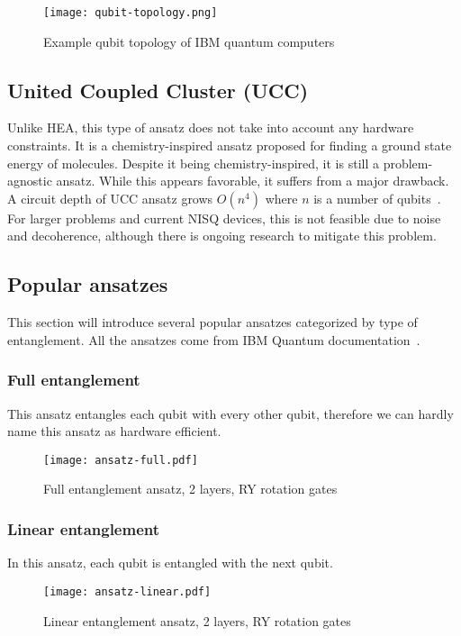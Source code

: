 \begin{figure}[H]
    \texttt{[image: qubit-topology.png]}
    \caption{Example qubit topology of IBM quantum computers~\cite{img:topology}}
    \label{fig:qubit_topology}
\end{figure}

\subsection{United Coupled Cluster (UCC)}
Unlike HEA, this type of ansatz does not take into account any hardware constraints. It is a chemistry-inspired ansatz proposed for finding a ground state energy of molecules. Despite it being chemistry-inspired, it is still a problem-agnostic ansatz. While this appears favorable, it suffers from a major drawback. A circuit depth of UCC ansatz grows $O(n^4)$ where $n$ is a number of qubits~\cite{ucc_ansatz}. For larger problems and current NISQ devices, this is not feasible due to noise and decoherence, although there is ongoing research to mitigate this problem.

\subsection{Popular ansatzes}\label{sec:ansatzes}
This section will introduce several popular ansatzes categorized by type of entanglement. All the ansatzes come from IBM Quantum documentation~\cite{twolocal}. 

\subsubsection{Full entanglement}
This ansatz entangles each qubit with every other qubit, therefore we can hardly name this ansatz as hardware efficient.
\begin{figure}[H]
    \centering
    \texttt{[image: ansatz-full.pdf]}
    \caption{Full entanglement ansatz, 2 layers, RY rotation gates}
\end{figure}

\subsubsection{Linear entanglement}
In this ansatz, each qubit is entangled with the next qubit. 
\begin{figure}[H]
    \centering
    \texttt{[image: ansatz-linear.pdf]}
    \caption{Linear entanglement ansatz, 2 layers, RY rotation gates}
\end{figure}

